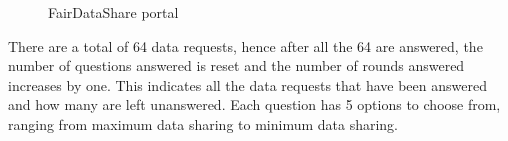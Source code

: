 \begin{figure}[htp]
  \hspace{1em}
  \caption{FairDataShare portal}
  \label{fig:bid}
\end{figure}


There are a total of 64 data requests, hence after all the 64 are answered, the number of questions answered is reset and the number of rounds answered increases by one. This indicates all the data requests that have been answered and how many are left unanswered. Each question has 5 options to choose from, ranging from maximum data sharing to minimum data sharing.

